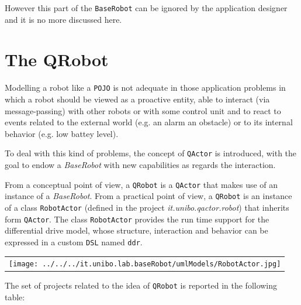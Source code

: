 However this part of the \texttt{BaseRobot} can be ignored by the application designer and it is no more discussed here.


\newpage 
\section{The QRobot }
Modelling a robot like a \texttt{POJO} is not adequate in those application problems in which a robot should be viewed as a proactive entity, able to interact (via message-passing) with other robots or with some control unit and to react to events related to the external world (e.g. an alarm an obstacle) or to its internal behavior (e.g. low battey level).

To deal with this kind of problems, the concept of \texttt{QActor} is introduced, with the goal to endow a \textit{BaseRobot} with new capabilities as regards the interaction.

From a conceptual point of view, a \texttt{QRobot} is a \texttt{QActor} that makes use of an instance of a \textit{BaseRobot}.
From a practical point of view, a \texttt{QRobot} is an instance of a class \texttt{RobotActor} (defined in the project \textit{it.unibo.qactor.robot}) that inherits form \texttt{QActor}. The class \texttt{RobotActor} provides the run time support for the differential drive model, whose structure, interaction and behavior can be expressed in a custom \texttt{DSL} named \texttt{ddr}.

 
\begin{center}
\begin{tabular}{ c }
    \texttt{[image: ../../../it.unibo.lab.baseRobot/umlModels/RobotActor.jpg]}\\
\end{tabular} 
\end{center}


\medskip 
The set of projects related to the idea of \texttt{QRobot} is reported in the following table:

